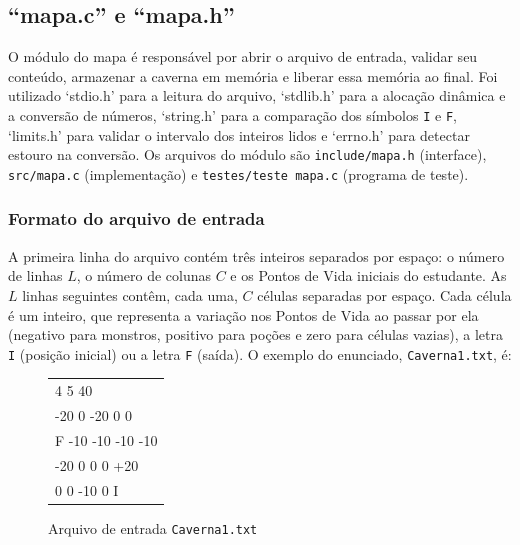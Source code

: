 \documentclass[12pt,a4paper]{article}
\makeatletter
\DeclareRobustCommand{\_}{%
  \ifmmode
    \nfss@text{\textunderscore}%
  \else
    \textunderscore\allowbreak
  \fi
}
\makeatother
\begin{document}
\subsection{``mapa.c'' e ``mapa.h''}
 
O módulo do mapa é responsável por abrir o arquivo de entrada, validar seu conteúdo, armazenar a caverna em memória e liberar essa memória ao final. Foi utilizado `stdio.h' para a leitura do arquivo, `stdlib.h' para a alocação dinâmica e a conversão de números, `string.h' para a comparação dos símbolos \texttt{I} e \texttt{F}, `limits.h' para validar o intervalo dos inteiros lidos e `errno.h' para detectar estouro na conversão. Os arquivos do módulo são \texttt{include/mapa.h} (interface), \texttt{src/mapa.c} (implementação) e \texttt{testes/teste\_mapa.c} (programa de teste).
 
\subsubsection*{Formato do arquivo de entrada}
 
A primeira linha do arquivo contém três inteiros separados por espaço: o número de linhas $L$, o número de colunas $C$ e os Pontos de Vida iniciais do estudante. As $L$ linhas seguintes contêm, cada uma, $C$ células separadas por espaço. Cada célula é um inteiro, que representa a variação nos Pontos de Vida ao passar por ela (negativo para monstros, positivo para poções e zero para células vazias), a letra \texttt{I} (posição inicial) ou a letra \texttt{F} (saída). O exemplo do enunciado, \texttt{Caverna1.txt}, é:
 
\begin{figure}[htbp]
    \centering
    \begin{minipage}{0.45\textwidth}
        \ttfamily\small
        \begin{tabular}{|l|}
        \hline
        4 5 40 \\
        -20 0 -20 0 0 \\
        F -10 -10 -10 -10 \\
        -20 0 0 0 +20 \\
        0 0 -10 0 I \\
        \hline
        \end{tabular}
    \end{minipage}
    \vspace{0.2cm}
    \caption{Arquivo de entrada \texttt{Caverna1.txt}}
\end{figure}
 
\end{document}
